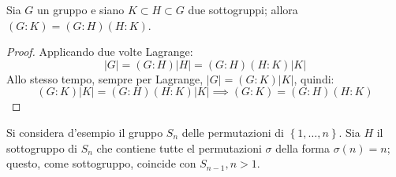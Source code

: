 \documentclass[11pt, a4paper]{scrartcl}
\theoremstyle{definition}
\numberwithin{esempio}{section}
\theoremstyle{definition}
\numberwithin{obs}{section}
\numberwithin{nota}{section}
\numberwithin{equation}{subsection}
\begin{document}
\begin{corollario}
	{}{}
	Sia $G$ un gruppo e siano $K \subset H \subset G$ due sottogruppi; allora $(G:K) = (G:H)(H:K)$.
	\begin{proof}
Applicando due volte Lagrange:
\[
|G| = (G:H) |H| = (G:H) (H:K) |K|
\] 
Allo stesso tempo, sempre per Lagrange, $|G| = (G:K) |K|$, quindi:
\[
(G:K) |K| = (G:H)(H:K)|K|\implies (G:K)= (G:H)(H:K)
\] 
	\end{proof}
\end{corollario}

Si considera d'esempio il gruppo $S_n$ delle permutazioni di $\left\{ 1, \ldots , n \right\} $. 
Sia $H$ il sottogruppo di $S_n$ che contiene tutte el permutazioni $\sigma $ della forma $\sigma (n) = n $; questo, come sottogruppo, coincide con $S_{n-1} , n > 1$.
\end{document}
